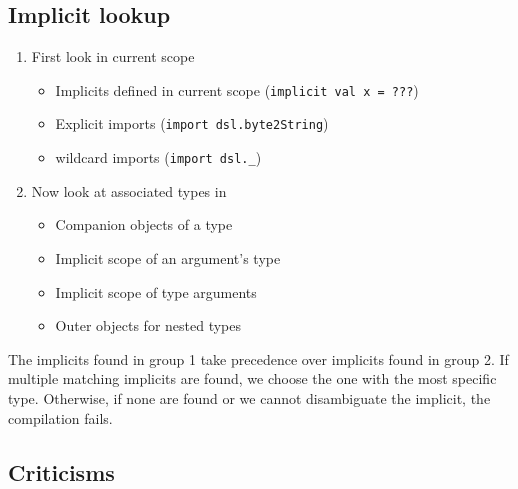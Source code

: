 \subsection{Implicit lookup}
\begin{enumerate}
	\item First look in current scope
	\begin{itemize}
		\item Implicits defined in current scope (\texttt{implicit val x = ???})
    \item Explicit imports (\texttt{import dsl.byte2String})
    \item wildcard imports (\texttt{import dsl._})
	\end{itemize}
	\item Now look at associated types in
	\begin{itemize}
		\item Companion objects of a type
		\item Implicit scope of an argument’s type
		\item Implicit scope of type arguments
		\item Outer objects for nested types
	\end{itemize}
\end{enumerate}

The implicits found in group 1 take precedence over implicits found in group 2. If multiple matching implicits are found, we choose the one with the most specific type. Otherwise, if none are found or we cannot disambiguate the implicit, the compilation fails.
        
\subsection{Criticisms}

